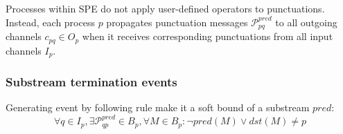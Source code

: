 Processes within SPE do not apply user-defined operators to punctuations. Instead, each process $p$ propagates punctuation messages $\mathcal{P}_{pq}^{pred}$ to all outgoing channels $c_{pq} \in O_p$  when it receives corresponding punctuations from all input channels $I_p$.

\subsubsection{Substream termination events}

\begin{lemma}
Generating event by following rule make it a soft bound of a substream $pred$:
\begin{equation}
\forall q \in I_p, \exists \mathcal{P}^{pred}_{qp} \in B_p, \forall M\in B_p : \neg pred(M) \vee dst(M) \ne p
\end{equation}
\end{lemma}

